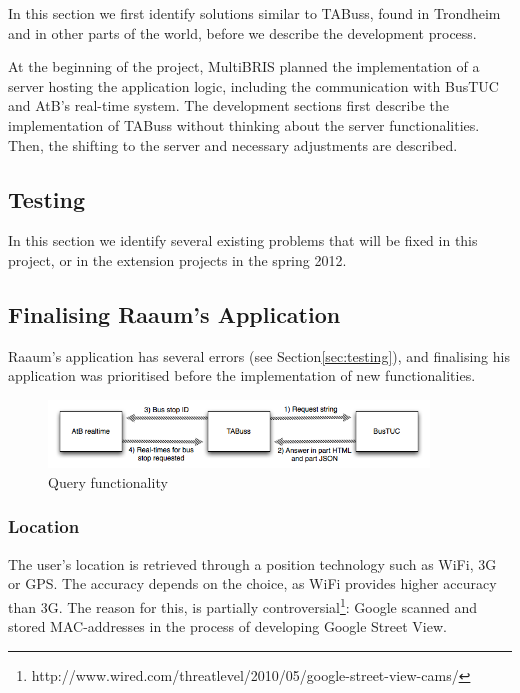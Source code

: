In this section we first identify solutions similar to TABuss, found in Trondheim and in other parts of the world, before we describe the development process.

At the beginning of the project, MultiBRIS\cite{multibris} planned the implementation of a server hosting the application logic, including the communication with BusTUC\cite{busstuc} and AtB's real-time system. The development sections first describe the implementation of TABuss without thinking about the server functionalities. Then, the shifting to the server and necessary adjustments are described.



\subsection{Testing}
In this section we identify several existing problems that will be fixed in this project, or in the extension projects in the spring 2012.


\subsection{Finalising Raaum's Application}
Raaum's application has several errors (see Section\ref{sec:testing}), and finalising his application was prioritised before the implementation of new functionalities. 
\begin{figure}[!h]
\begin{center}
\includegraphics[width=0.9\textwidth]{Method/Figures/noserver.png}
\caption{Query functionality}
\label{fig:noserver}
\end{center}
\end{figure}
\subsubsection{Location}
The user's location is retrieved through a position technology such as WiFi, 3G or GPS. The accuracy depends on the choice, as WiFi provides higher accuracy than 3G. The reason for this, is partially controversial\footnote{http://www.wired.com/threatlevel/2010/05/google-street-view-cams/}: Google scanned and stored MAC-addresses in the process of developing Google Street View. 


